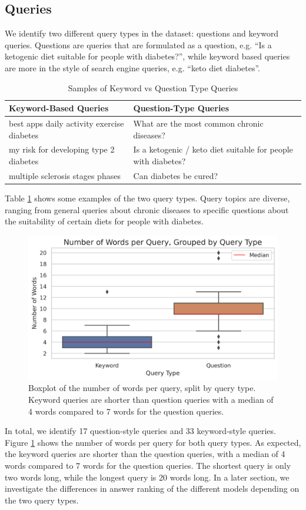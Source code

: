 \subsection{Queries}
We identify two different query types in the dataset: questions and keyword queries.
Questions are queries that are formulated as a question, e.g. ``Is a ketogenic diet suitable for people with diabetes?'', while keyword based queries are more in the style of search engine queries, e.g. ``keto diet diabetes''.
\begin{table}[tb]
\centering
\begin{tabularx}{\textwidth}{XX}
\hline
\textbf{Keyword-Based Queries} & \textbf{Question-Type Queries} \\
\hline
best apps daily activity exercise diabetes & What are the most common chronic diseases? \\
\hline
my risk for developing type 2 diabetes & Is a ketogenic / keto diet suitable for people with diabetes? \\
\hline
multiple sclerosis stages phases & Can diabetes be cured? \\
\hline
\end{tabularx}
\caption{Samples of Keyword vs Question Type Queries}
\label{table:querie-samples}
\end{table}
Table \ref{table:querie-samples} shows some examples of the two query types.
Query topics are diverse, ranging from general queries about chronic diseases to specific questions about the suitability of certain diets for people with diabetes.

\begin{figure}
\centering
\includegraphics[width=\textwidth]{images/num_words_per_query.png}
\caption{Boxplot of the number of words per query, split by query type. Keyword queries are shorter than question queries with a median of 4 words compared to 7 words for the question queries.}
\label{fig:num_words_per_query}
\end{figure}
In total, we identify 17 question-style queries and 33 keyword-style queries.
Figure \ref{fig:num_words_per_query} shows the number of words per query for both query types.
As expected, the keyword queries are shorter than the question queries, with a median of 4 words compared to 7 words for the question queries.
The shortest query is only two words long, while the longest query is 20 words long.
In a later section, we investigate the differences in answer ranking of the different models depending on the two query types.
